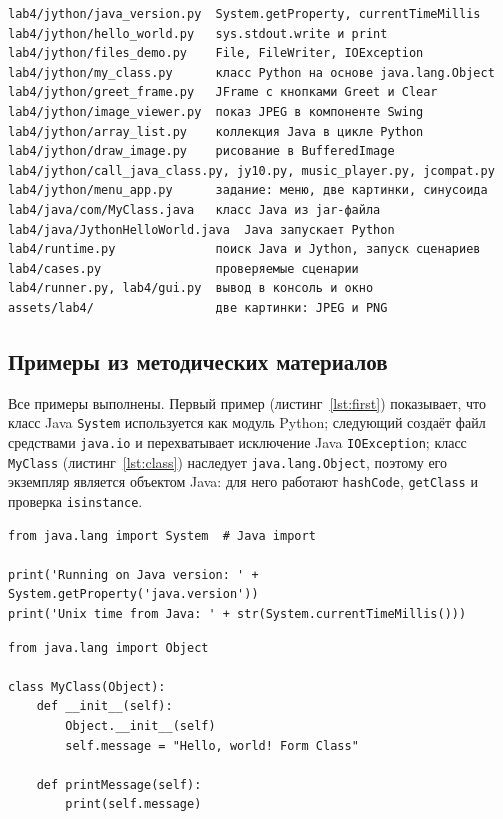 \documentclass[14pt,a4paper]{extarticle}
\begin{document}
\begin{Verbatim}[fontsize=\scriptsize, frame=single, samepage=true]
lab4/jython/java_version.py  System.getProperty, currentTimeMillis
lab4/jython/hello_world.py   sys.stdout.write и print
lab4/jython/files_demo.py    File, FileWriter, IOException
lab4/jython/my_class.py      класс Python на основе java.lang.Object
lab4/jython/greet_frame.py   JFrame с кнопками Greet и Clear
lab4/jython/image_viewer.py  показ JPEG в компоненте Swing
lab4/jython/array_list.py    коллекция Java в цикле Python
lab4/jython/draw_image.py    рисование в BufferedImage
lab4/jython/call_java_class.py, jy10.py, music_player.py, jcompat.py
lab4/jython/menu_app.py      задание: меню, две картинки, синусоида
lab4/java/com/MyClass.java   класс Java из jar-файла
lab4/java/JythonHelloWorld.java  Java запускает Python
lab4/runtime.py              поиск Java и Jython, запуск сценариев
lab4/cases.py                проверяемые сценарии
lab4/runner.py, lab4/gui.py  вывод в консоль и окно
assets/lab4/                 две картинки: JPEG и PNG
\end{Verbatim}

\subsection{Примеры из методических материалов}

Все примеры выполнены. Первый пример (листинг~\ref{lst:first}) показывает, что класс
Java \texttt{System} используется как модуль Python; следующий создаёт файл средствами
\texttt{java.io} и перехватывает исключение Java \texttt{IOException}; класс
\texttt{MyClass} (листинг~\ref{lst:class}) наследует \texttt{java.lang.Object}, поэтому
его экземпляр является объектом Java: для него работают \texttt{hashCode},
\texttt{getClass} и проверка \texttt{isinstance}.

\begin{lstlisting}[style=python, caption={Класс Java из Python}, label={lst:first}]
from java.lang import System  # Java import

print('Running on Java version: ' + System.getProperty('java.version'))
print('Unix time from Java: ' + str(System.currentTimeMillis()))
\end{lstlisting}

\begin{lstlisting}[style=python, caption={Класс Python, наследующий класс Java}, label={lst:class}]
from java.lang import Object

class MyClass(Object):
    def __init__(self):
        Object.__init__(self)
        self.message = "Hello, world! Form Class"

    def printMessage(self):
        print(self.message)
\end{lstlisting}
\end{document}
